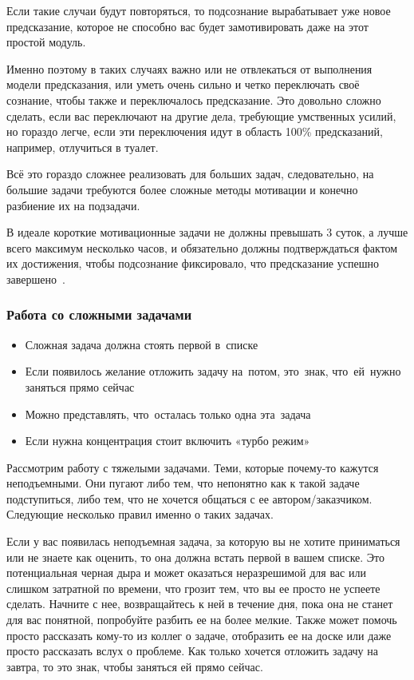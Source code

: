 \documentclass{../industrial-development}
\begin{document}
Если такие случаи будут повторяться, то подсознание вырабатывает уже новое предсказание, которое не способно вас будет замотивировать даже на этот простой модуль.

Именно поэтому в таких случаях важно или не отвлекаться от выполнения модели предсказания, или уметь очень сильно и четко переключать своё сознание, чтобы также и переключалось предсказание. Это довольно сложно сделать, если вас переключают на другие дела, требующие умственных усилий, но гораздо легче, если эти переключения идут в область 100\% предсказаний, например, отлучиться в туалет.

Всё это гораздо сложнее реализовать для больших задач, следовательно, на большие задачи требуются более сложные методы мотивации и конечно разбиение их на подзадачи.

В идеале короткие мотивационные задачи не должны превышать 3 суток, а лучше всего максимум несколько часов, и обязательно должны подтверждаться фактом их достижения, чтобы подсознание фиксировало, что предсказание успешно завершено~\cite{TasksHabr}.

\begin{frame} \frametitle{Работа со сложными задачами}
  \begin{itemize}
  \item Сложная задача должна стоять первой в~списке
  \item Если появилось желание отложить задачу на~потом, это~знак, что~ей~нужно заняться прямо сейчас
  \item Можно представлять, что~осталась только одна эта~задача
  \item Если нужна концентрация стоит включить «турбо режим»
  \end{itemize}
\end{frame}

\lecturenotes

Рассмотрим работу с тяжелыми задачами. Теми, которые почему-то кажутся неподъемными. Они пугают либо тем, что непонятно как к такой задаче подступиться, либо тем, что не хочется общаться с ее автором/заказчиком. Следующие несколько правил именно о таких задачах.

Если у вас появилась неподъемная задача, за которую вы не хотите приниматься или не знаете как оценить, то она должна встать первой в вашем списке. Это потенциальная черная дыра и может оказаться неразрешимой для вас или слишком затратной по времени, что грозит тем, что вы ее просто не успеете сделать. Начните с нее, возвращайтесь к ней в течение дня, пока она не станет для вас понятной, попробуйте разбить ее на более мелкие. 
Также может помочь просто рассказать кому-то из коллег о задаче, отобразить ее на доске или даже просто рассказать вслух о проблеме.
Как только хочется отложить задачу на завтра, то это знак, чтобы заняться ей прямо сейчас.
\end{document}

